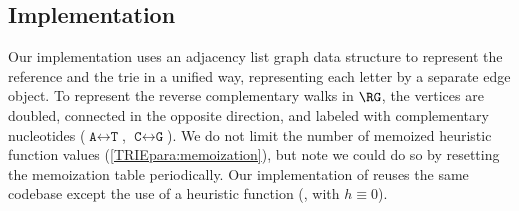 \subsection{Implementation \astarix}

Our \astarix implementation uses an adjacency list graph data structure to
represent the reference and the trie in a unified way, representing each letter
by a separate edge object.
To represent the reverse complementary walks in $\RG$, the vertices are doubled,
connected in the opposite direction, and labeled with complementary nucleotides
($\texttt{A} \leftrightarrow \texttt{T}$, $\texttt{C} \leftrightarrow
\texttt{G}$).
%
We do not limit the number of memoized heuristic function values
(\cref{TRIEpara:memoization}), but note we could do so by resetting the memoization
table periodically.
%
Our implementation of \dijkstra reuses the same \astarix codebase except the
use of a heuristic function (\ie, with $h \equiv 0$).